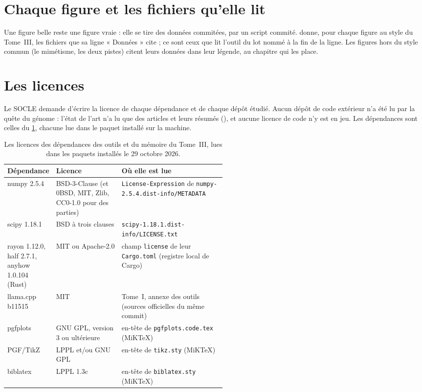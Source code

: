 

\section{Chaque figure et les fichiers qu'elle lit}\label{t3ann:sec:figures}

Une figure belle reste une figure vraie : elle se tire des données commitées, par un script commité.  donne, pour chaque figure au style du Tome~III, les fichiers que sa ligne « Données » cite ; ce sont ceux que lit l'outil du lot nommé à la fin de la ligne. Les figures hors du style commun (le mimétisme, les deux pistes) citent leurs données dans leur légende, au chapitre qui les place.



\section{Les licences}\label{t3ann:sec:licences}

Le SOCLE demande d'écrire la licence de chaque dépendance et de chaque dépôt étudié. Aucun dépôt de code extérieur n'a été lu par la quête du génome : l'état de l'art n'a lu que des articles et leurs résumés (), et aucune licence de code n'y est en jeu. Les dépendances sont celles du \cref{t3ann:tab:licences}, chacune lue dans le paquet installé sur la machine.

\begin{table}[ht]
\centering\footnotesize
\caption[Les licences des dépendances du Tome~III]{Les licences des dépendances des outils et du mémoire du Tome~III, lues dans les paquets installés le 29 octobre 2026.}
\label{t3ann:tab:licences}
\begin{tabularx}{\linewidth}{@{}>{\raggedright\arraybackslash}p{0.22\linewidth}>{\raggedright\arraybackslash}p{0.30\linewidth}>{\raggedright\arraybackslash}X@{}}
\toprule
Dépendance & Licence & Où elle est lue \\
\midrule
numpy 2.5.4 & BSD-3-Clause (et 0BSD, MIT, Zlib, CC0-1.0 pour des parties) & \texttt{License-Expression} de \texttt{numpy-2.5.4.dist-info/METADATA} \\
scipy 1.18.1 & BSD à trois clauses & \texttt{scipy-1.18.1.dist-info/LICENSE.txt} \\
rayon 1.12.0, half 2.7.1, anyhow 1.0.104 (Rust) & MIT ou Apache-2.0 & champ \texttt{license} de leur \texttt{Cargo.toml} (registre local de Cargo) \\
llama.cpp b11515 & MIT & Tome~I, annexe des outils (sources officielles du même commit) \\
pgfplots & GNU GPL, version 3 ou ultérieure & en-tête de \texttt{pgfplots.code.tex} (MiKTeX) \\
PGF/TikZ & LPPL et/ou GNU GPL & en-tête de \texttt{tikz.sty} (MiKTeX) \\
biblatex & LPPL 1.3c & en-tête de \texttt{biblatex.sty} (MiKTeX) \\
\bottomrule
\end{tabularx}
\end{table}

